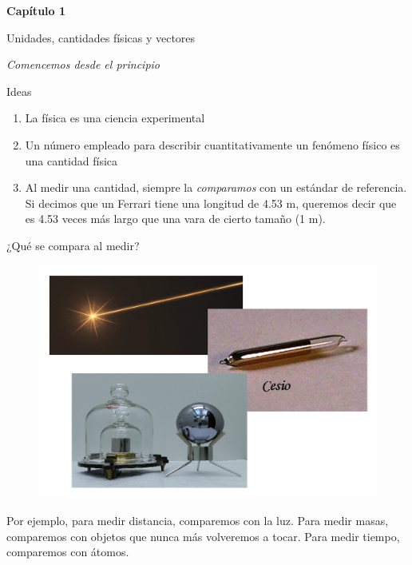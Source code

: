 \begin{frame}
\begin{center}
    \Huge \textbf{Capítulo 1}
    
    \LARGE Unidades, cantidades físicas y vectores

    \textit{Comencemos desde el principio}
\end{center}
\end{frame}

\begin{frame}{Ideas}
    \begin{enumerate}
        \item La física es una ciencia experimental
        \item Un número empleado para describir cuantitativamente un fenómeno físico es una cantidad física
        \item Al medir una cantidad, siempre la \textit{comparamos} con un estándar de referencia. Si decimos que un Ferrari tiene una longitud de 4.53 m, queremos decir que es 4.53 veces más largo que una vara de cierto tamaño (1 m).
    \end{enumerate}
\end{frame}

\begin{frame}{¿Qué se compara al medir?}
    \begin{figure}
        \centering
        \includegraphics[width=0.8\linewidth]{figures/que-se-mide.png}
    \end{figure}

    Por ejemplo, para medir distancia, comparemos con la luz. Para medir masas, comparemos con objetos que nunca más volveremos a tocar. Para medir tiempo, comparemos con átomos.    
\end{frame}

